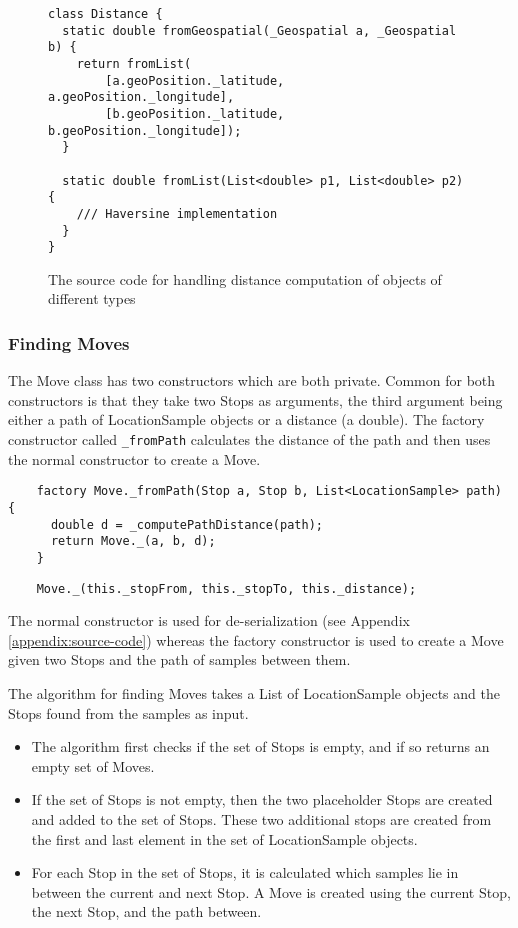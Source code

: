 \begin{figure}[h]
    \centering
    \begin{verbatim}
class Distance {
  static double fromGeospatial(_Geospatial a, _Geospatial b) {
    return fromList(
        [a.geoPosition._latitude, a.geoPosition._longitude],
        [b.geoPosition._latitude, b.geoPosition._longitude]);
  }

  static double fromList(List<double> p1, List<double> p2) {
    /// Haversine implementation
  }
}
\end{verbatim}
    \caption{The source code for handling distance computation of objects of different types}
    \label{fig:source-code-distance}
\end{figure}

\subsubsection*{Finding Moves}
The Move class has two constructors which are both private. Common for both constructors is that they take two Stops as arguments, the third argument being either a path of LocationSample objects or a distance (a double). The factory constructor called \verb|_fromPath| calculates the distance of the path and then uses the normal constructor to create a Move. 
\begin{verbatim}
    factory Move._fromPath(Stop a, Stop b, List<LocationSample> path) {
      double d = _computePathDistance(path);
      return Move._(a, b, d);
    }
\end{verbatim}

\begin{verbatim}
    Move._(this._stopFrom, this._stopTo, this._distance);
\end{verbatim}
The normal constructor is used for de-serialization (see Appendix \ref{appendix:source-code}) whereas the factory constructor is used to create a Move given two Stops and the path of samples between them.

The algorithm for finding Moves takes a List of LocationSample objects and the Stops found from the samples as input. 

\begin{itemize}
    \item The algorithm first checks if the set of Stops is empty, and if so returns an empty set of Moves. 
    \item If the set of Stops is not empty, then the two placeholder Stops are created and added to the set of Stops. These two additional stops are created from the first and last element in the set of LocationSample objects. 
    \item For each Stop in the set of Stops, it is calculated which samples lie in between the current and next Stop. A Move is created using the current Stop, the next Stop, and the path between. 
\end{itemize}

